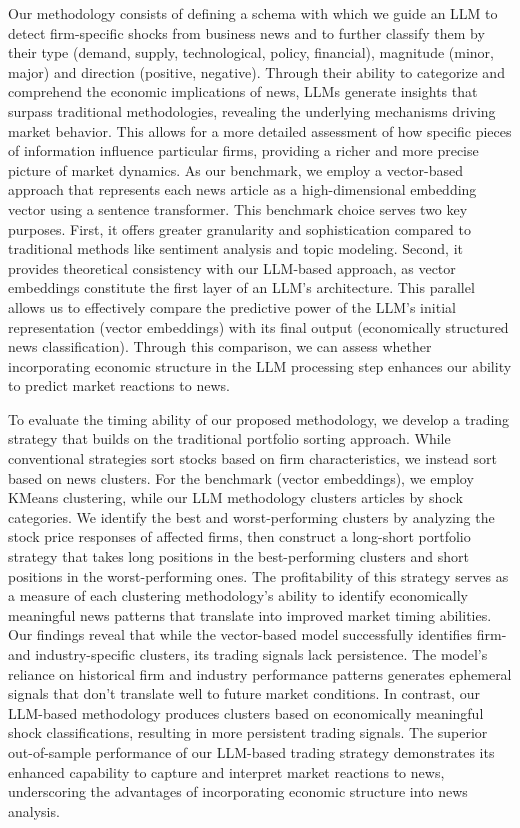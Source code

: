 \mx
Our methodology consists of defining a schema with which we guide an LLM to detect firm-specific shocks from business news and to further classify them by their type (demand, supply, technological, policy, financial), magnitude (minor, major) and direction (positive, negative). Through their ability to categorize and comprehend the economic implications of news, LLMs generate insights that surpass traditional methodologies, revealing the underlying mechanisms driving market behavior. This allows for a more detailed assessment of how specific pieces of information influence particular firms, providing a richer and more precise picture of market dynamics.
%
As our benchmark, we employ a vector-based approach that represents each news article as a high-dimensional embedding vector using a sentence transformer. This benchmark choice serves two key purposes. First, it offers greater granularity and sophistication compared to traditional methods like sentiment analysis and topic modeling. Second, it provides theoretical consistency with our LLM-based approach, as vector embeddings constitute the first layer of an LLM's architecture. This parallel allows us to effectively compare the predictive power of the LLM's initial representation (vector embeddings) with its final output (economically structured news classification). Through this comparison, we can assess whether incorporating economic structure in the LLM processing step enhances our ability to predict market reactions to news.

\mx 
To evaluate the timing ability of our proposed methodology, we develop a trading strategy that builds on the traditional portfolio sorting approach. While conventional strategies sort stocks based on firm characteristics, we instead sort based on news clusters. For the benchmark (vector embeddings), we employ KMeans clustering, while our LLM methodology clusters articles by shock categories. We identify the best and worst-performing clusters by analyzing the stock price responses of affected firms, then construct a long-short portfolio strategy that takes long positions in the best-performing clusters and short positions in the worst-performing ones. The profitability of this strategy serves as a measure of each clustering methodology's ability to identify economically meaningful news patterns that translate into improved market timing abilities.
%
Our findings reveal that while the vector-based model successfully identifies firm- and industry-specific clusters, its trading signals lack persistence. The model's reliance on historical firm and industry performance patterns generates ephemeral signals that don't translate well to future market conditions. In contrast, our LLM-based methodology produces clusters based on economically meaningful shock classifications, resulting in more persistent trading signals. The superior out-of-sample performance of our LLM-based trading strategy demonstrates its enhanced capability to capture and interpret market reactions to news, underscoring the advantages of incorporating economic structure into news analysis.

